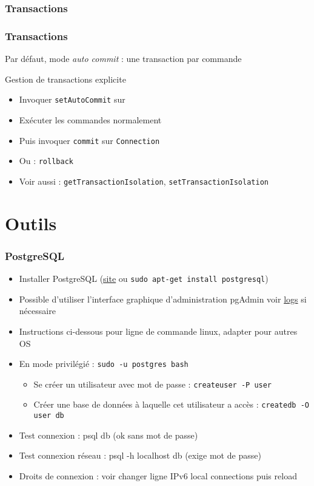 \documentclass[english, french]{beamer}
\begin{document}
\subsubsection{Transactions}
\begin{frame}
	\frametitle{Transactions}
	Par défaut, mode \emph{auto commit} : une transaction par commande
	\begin{block}{Gestion de transactions explicite}
		\begin{itemize}
			\item Invoquer \texttt{setAutoCommit} sur 
			\item Exécuter les commandes normalement
			\item Puis invoquer \texttt{commit} sur \texttt{Connection}
			\item Ou : \texttt{rollback}
			\item Voir aussi : \texttt{getTransactionIsolation}, \texttt{setTransactionIsolation}
		\end{itemize}
	\end{block}
\end{frame}

\section{Outils}
\begin{frame}
	\frametitle{PostgreSQL}
	\begin{itemize}
		\item Installer PostgreSQL (\href{http://www.postgresql.org/}{site} {\tiny ou \texttt{sudo apt-get install postgresql}})
		\item Possible d’utiliser l’interface graphique d’administration pgAdmin {\tiny voir \href{https://wiki.postgresql.org/wiki/Troubleshooting_Installation\#Collect_the_installer_log_file}{logs} si nécessaire}
		\item Instructions ci-dessous pour ligne de commande linux, adapter pour autres OS
		\item En mode privilégié : \texttt{sudo -u postgres bash}
		\begin{itemize}
			\item Se créer un utilisateur avec mot de passe : \texttt{createuser -P user}
			\item Créer une base de données à laquelle cet utilisateur a accès : \texttt{createdb -O user db}
		\end{itemize}
		\item Test connexion : psql db (ok sans mot de passe)
		\item Test connexion réseau : psql -h localhost db (exige mot de passe)
		\item Droits de connexion : voir   {\tiny changer ligne IPv6 local connections puis reload}
	\end{itemize}
\end{frame}
\end{document}
